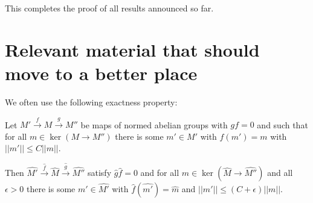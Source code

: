 This completes the proof of all results announced so far.



\section{Relevant material that should move to a better place}

We often use the following exactness property:

\begin{proposition}
  \label{prop:completeexact}
Let $M'\xrightarrow{f} M\xrightarrow{g} M''$ be maps of normed abelian groups with $gf=0$ and such that for all $m\in \ker(M\to M'')$ there is some $m'\in M'$ with $f(m')=m$ with $||m'||\leq C||m||$.

Then $\widehat{M'}\xrightarrow{\widehat{f}} \widehat{M}\xrightarrow{\widehat{g}} \widehat{M''}$ satisfy $\widehat{g}\widehat{f}=0$ and for all $m\in \ker(\widehat{M}\to \widehat{M''})$ and all $\epsilon>0$ there is some $m'\in \widehat{M'}$ with $\widehat{f}(\widehat{m'})=\widehat{m}$ and $||m'||\leq (C+\epsilon)||m||$.
\end{proposition}


